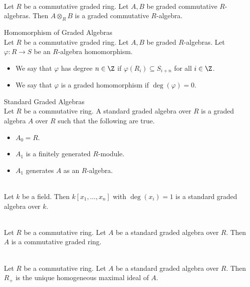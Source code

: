 \documentclass[a4paper]{article}
\begin{document}
\begin{lmm}{}{}\\
Let $R$ be a commutative graded ring. Let $A,B$ be graded commutative $R$-algebras. Then $A\otimes_RB$ is a graded commutative $R$-algebra. 
\end{lmm}

\begin{defn}{Homomorphism of Graded Algebras}{}\\
Let $R$ be a commutative graded ring. Let $A,B$ be graded $R$-algebras. Let $\varphi:R\to S$ be an $R$-algebra homomorphism. 
\begin{itemize}
\item We say that $\varphi$ has degree $n\in\Z$ if $\varphi(R_i)\subseteq S_{i+n}$ for all $i\in\Z$. 
\item We say that $\varphi$ is a graded homomorphism if $\deg(\varphi)=0$. 
\end{itemize}
\end{defn}

\begin{defn}{Standard Graded Algebras}{}\\
Let $R$ be a commutative ring. A standard graded algebra over $R$ is a graded algebra $A$ over $R$ such that the following are true. 
\begin{itemize}
\item $A_0=R$. 
\item $A_1$ is a finitely generated $R$-module. 
\item $A_1$ generates $A$ as an $R$-algebra. 
\end{itemize}
\end{defn}

\begin{eg}{}{}\\
Let $k$ be a field. Then $k[x_1,\dots,x_n]$ with $\deg(x_i)=1$ is a standard graded algebra over $k$. 
\end{eg}

\begin{lmm}{}{}\\
Let $R$ be a commutative ring. Let $A$ be a standard graded algebra over $R$. Then $A$ is a commutative graded ring. 
\end{lmm}

\begin{prp}{}{}\\
Let $R$ be a commutative ring. Let $A$ be a standard graded algebra over $R$. Then $R_+$ is the unique homogeneous maximal ideal of $A$. 
\end{prp}
\end{document}
